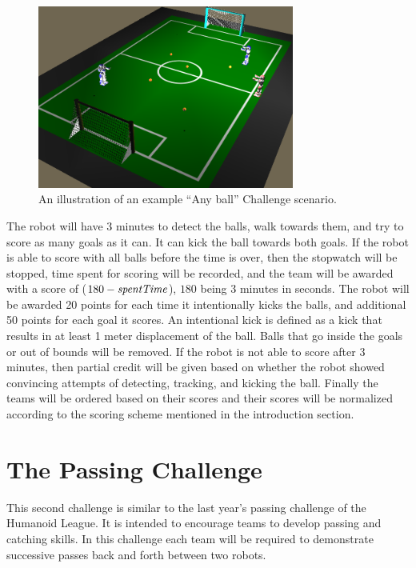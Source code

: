 \documentclass{article}
\begin{document}
\begin{figure}[htbp]
 \centering
 \includegraphics[width=0.75\textwidth]{figures/nao_anyballchallenge.png}
 \caption{An illustration of an example ``Any ball'' Challenge scenario.}
 \label{fig:anyballchallenge}
\end{figure}

The robot will have 3 minutes to detect the balls, walk towards them, and try to score as many goals as it can. It can kick the ball towards both goals. If the robot is able to score with all balls before the time is over, then the stopwatch will be stopped, time spent for scoring will be recorded, and the team will be awarded with a score of ($180 - \emph{spentTime}$), $180$ being 3 minutes in seconds. The robot will be awarded 20 points for each time it intentionally kicks the balls, and additional 50 points for each goal it scores. An intentional kick is defined as a kick that results in at least 1 meter displacement of the ball. Balls that go inside the goals or out of bounds will be removed. If the robot is not able to score after 3 minutes, then partial credit will be given based on whether the robot showed convincing attempts of detecting, tracking, and kicking the ball. Finally the teams will be ordered based on their scores and their scores will be normalized according to the scoring scheme mentioned in the introduction section.

\section{The Passing Challenge}
\label{sec:passing}

This second challenge is similar to the last year's passing challenge of the Humanoid League. It is intended to encourage teams to develop passing and catching skills. In this challenge each team will be required to demonstrate successive passes back and forth between two robots.
\end{document}
